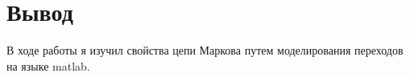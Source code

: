 \chapter{Вывод}
\label{ch:сhap5}

В ходе работы я изучил свойства цепи Маркова путем моделирования переходов на языке matlab. 

\endinput